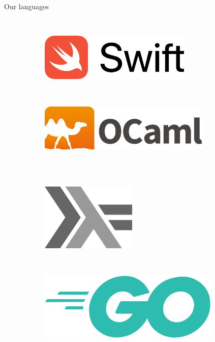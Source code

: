 \documentclass[NET,english,aspectratio=43,notitleframe]{tumbeamer}
\begin{document}
\begin{frame}{Our languages}
\begin{figure}
    \centering

    \begin{subfigure}[t]{0.2\textwidth}
        \centering
    \end{subfigure}
    ~ 
    \begin{subfigure}[t]{0.3\textwidth}
        \centering
        \includegraphics[width=0.8\textwidth]{pics/swift}
    \end{subfigure}
    ~ 
    \begin{subfigure}[t]{0.3\textwidth}
        \centering
        \includegraphics[width=0.9\textwidth]{pics/ocaml}
    \end{subfigure}
    \\
    \vspace{2.5em}
    \centering
    ~ 
    \begin{subfigure}[t]{0.2\columnwidth}
        \centering
        \includegraphics[width=0.5\textwidth]{pics/haskell}
    \end{subfigure}
    ~ 
    \begin{subfigure}[t]{0.2\columnwidth}
        \centering
        \includegraphics[width=0.95\textwidth]{pics/go}

\end{subfigure}
\end{figure}
\end{frame}
\end{document}
